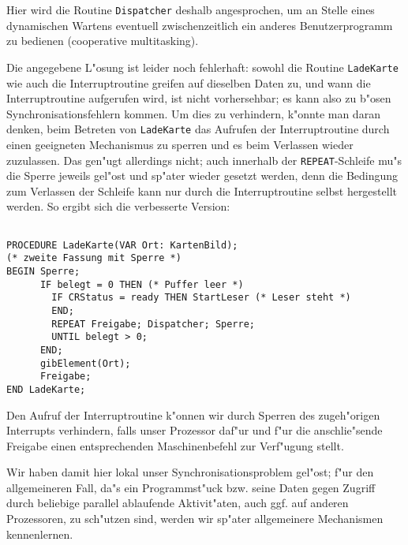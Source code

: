 Hier wird die Routine {\tt Dispatcher} deshalb angesprochen,
um an Stelle eines dynamischen Wartens eventuell zwischenzeitlich
ein anderes Benutzerprogramm zu bedienen
(cooperative multitasking).

Die angegebene L"osung ist leider noch fehlerhaft:
sowohl die Routine {\tt LadeKarte} wie auch die Interruptroutine
greifen auf dieselben Daten zu, und wann die Interruptroutine
aufgerufen wird, ist nicht vorhersehbar; es kann also zu b"osen
Synchronisationsfehlern kommen.
Um dies zu verhindern, k"onnte man daran denken,
beim Betreten von {\tt LadeKarte} das Aufrufen der Interruptroutine 
durch einen geeigneten Mechanismus zu sperren 
und es beim Verlassen wieder zuzulassen.
Das gen"ugt allerdings nicht; auch innerhalb der {\tt REPEAT}-Schleife
mu"s die Sperre jeweils gel"ost und sp"ater
wieder gesetzt werden, denn die Bedingung zum Verlassen der Schleife
kann nur durch die Interruptroutine selbst hergestellt werden.
So ergibt sich die verbesserte Version:

\begin{verbatim}

PROCEDURE LadeKarte(VAR Ort: KartenBild);
(* zweite Fassung mit Sperre *)
BEGIN Sperre;
      IF belegt = 0 THEN (* Puffer leer *)
        IF CRStatus = ready THEN StartLeser (* Leser steht *)
        END;
        REPEAT Freigabe; Dispatcher; Sperre;
        UNTIL belegt > 0;
      END;
      gibElement(Ort);
      Freigabe;
END LadeKarte;

\end{verbatim}

Den Aufruf der Interruptroutine k"onnen wir durch Sperren des
zugeh"origen Interrupts verhindern, falls unser Prozessor daf"ur
und f"ur die anschlie"sende Freigabe einen entsprechenden
Maschinenbefehl zur Verf"ugung stellt.

Wir haben damit hier lokal unser Synchronisationsproblem gel"ost;
f"ur den allgemeineren Fall, da"s ein Programmst"uck 
bzw. seine Daten gegen Zugriff durch beliebige parallel ablaufende
Aktivit"aten, auch ggf. auf anderen Prozessoren, zu sch"utzen sind,
werden wir sp"ater allgemeinere Mechanismen kennenlernen.

\endinput

